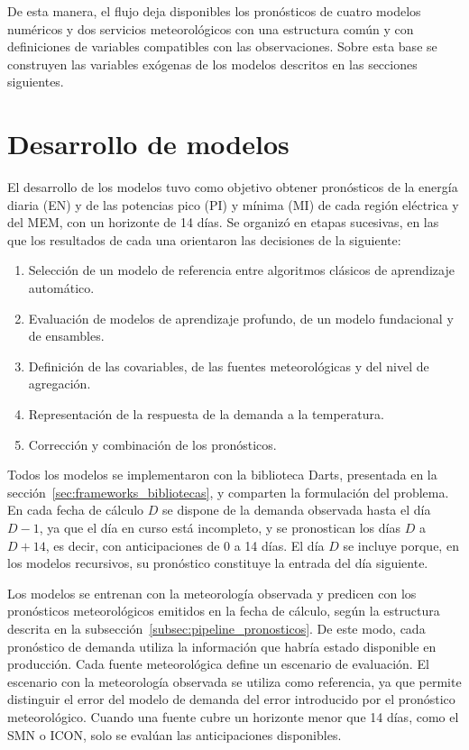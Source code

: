 De esta manera, el flujo deja disponibles los pronósticos de cuatro modelos numéricos y dos servicios meteorológicos con una estructura común y con definiciones de variables compatibles con las observaciones. Sobre esta base se construyen las variables exógenas de los modelos descritos en las secciones siguientes.

\section{Desarrollo de modelos}
\label{sec:desarrollo_modelos}

El desarrollo de los modelos tuvo como objetivo obtener pronósticos de la energía diaria (EN) y de las potencias pico (PI) y mínima (MI) de cada región eléctrica y del MEM, con un horizonte de 14 días. Se organizó en etapas sucesivas, en las que los resultados de cada una orientaron las decisiones de la siguiente:

\begin{enumerate}
	\item Selección de un modelo de referencia entre algoritmos clásicos de aprendizaje automático.
	\item Evaluación de modelos de aprendizaje profundo, de un modelo fundacional y de ensambles.
	\item Definición de las covariables, de las fuentes meteorológicas y del nivel de agregación.
	\item Representación de la respuesta de la demanda a la temperatura.
	\item Corrección y combinación de los pronósticos.
\end{enumerate}

Todos los modelos se implementaron con la biblioteca Darts, presentada en la sección~\ref{sec:frameworks_bibliotecas}, y comparten la formulación del problema. En cada fecha de cálculo $D$ se dispone de la demanda observada hasta el día $D-1$, ya que el día en curso está incompleto, y se pronostican los días $D$ a $D+14$, es decir, con anticipaciones de 0 a 14 días. El día $D$ se incluye porque, en los modelos recursivos, su pronóstico constituye la entrada del día siguiente.

Los modelos se entrenan con la meteorología observada y predicen con los pronósticos meteorológicos emitidos en la fecha de cálculo, según la estructura descrita en la subsección~\ref{subsec:pipeline_pronosticos}. De este modo, cada pronóstico de demanda utiliza la información que habría estado disponible en producción. Cada fuente meteorológica define un escenario de evaluación. El escenario con la meteorología observada se utiliza como referencia, ya que permite distinguir el error del modelo de demanda del error introducido por el pronóstico meteorológico. Cuando una fuente cubre un horizonte menor que 14 días, como el SMN o ICON, solo se evalúan las anticipaciones disponibles.

